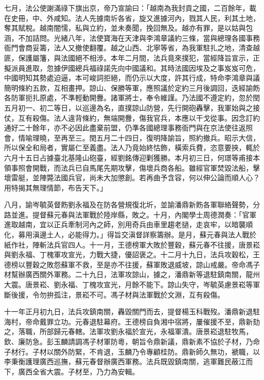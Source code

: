 \begin{pinyinscope}
七月，法公使謝滿祿下旗出京，帝乃宣諭曰：「越南為我封貢之國，二百餘年，載在史冊，中、外咸知。法人先據南圻各省，旋又進據河內，戮其人民，利其土地，奪其賦稅。越南闇懦，私與立約，並未奏聞，挽回無及。越亦有罪，是以姑與包涵，不加詰問。光緒八年，法使寶海在天津與李鴻章議約三條，當與總理各國事務衙門會商妥籌，法人又撤使翻覆。越之山西、北寧等省，為我軍駐扎之地，清查越匪，保護屬籓，與法國絕不相涉。本年二月間，法兵竟來撲犯，當經降旨宣示，正擬派員進取，忽據伊國總兵福祿諾先向中國議和。其時法國因埃及之事岌岌可危，中國明知其勢處迫逼，本可峻詞拒絕，而仍示以大度，許其行成，特命李鴻章與議簡明條約五款，互相畫押。諒山、保勝等軍，應照議於定約三月後調回，迭經諭飭各防軍扼扎原處，不準輕動開釁。諸軍將士，奉令維謹。乃法國不遵定約，忽於閏五月初一、初二等日，以巡邊為名，直撲諒山防營，先行開砲轟擊，我軍始與之接仗，互有殺傷。法人違背條約，無端開釁，傷我官兵，本應以干戈從事。因念訂約通好二十餘年，亦不必因此盡棄前盟，仍準各國總理事務衙門與在京法使往返照會，情喻理曉，至再至三。閏五月二十四日，復明降諭旨，照約撤兵。昭示大信，所以保全和局者，實屬仁至義盡。法人乃竟始終怙飾，橫索兵費，恣意要挾，輒於六月十五日占據臺北基隆山砲臺，經劉銘傳迎剿獲勝。本月初三日，何璟等甫接本領事照會開戰，而法兵已自馬尾先期攻擊，傷壞兵商各船。雖經官軍焚毀法船，擊壞雷艇，並陣斃法國兵官，尚未大加懲創。若再曲予含容，何以伸公論而順人心？用特揭其無理情節，布告天下。」

八月，諭岑毓英督飭劉永福及在防各營規復北圻，並諭潘鼎新飭各軍聯絡聲勢，分路並進。提督蘇元春與法軍戰於陸岸縣，敗之。十月，內閣學士周德潤奏：「官軍進取越南，宜以正兵牽制河內之師，別用奇兵由車里趨老撾，走哀牢，以暗襲順化，募用滇邊土人，必能得力。」得旨交滇督詳察籌辦。是月，蘇元春與法人戰於紙作社，陣斬法兵官四人。十一月，王德榜軍大敗於豐穀，蘇元春不往援，唐景崧與劉永福、丁槐軍攻宣光，力戰大捷，優詔褒之。十二月十九日，法兵攻穀松，王德榜以豐穀之敗怨蘇軍不救，至是亦不往援，蘇軍敗退威坡，諒山戒嚴。帝命馮子材幫辦廣西關外軍務。二十九日，法軍攻諒山，據之，潘鼎新等退駐鎮南關，龍州大震。唐景崧、劉永福、丁槐攻宣光，月餘不能下。諒山失守，岑毓英慮景崧等軍斷後援，令勿拚孤注，景崧不可。馮子材與法軍戰於文淵，互有殺傷。

十一年正月初九日，法兵攻鎮南關，轟毀關門而去，提督楊玉科戰歿。潘鼎新退駐海村，帝命戴罪立功。元春退駐幕府。王德榜自負湘中宿將，屢催援不至，鼎新劾之，落職，所部歸元春轄。法軍攻劉永福於宣光，永福軍潰。唐景崧退駐牧馬，欽、廉防急。彭玉麟請調馮子材軍防粵，朝旨令鼎新議，鼎新素不協於子材，乃命子材行。子材以關外防緊，不肯退，玉麟乃令專顧桂防。鼎新師久無功，褫職，以李秉衡護理廣西巡撫，蘇元春督辦廣西軍務。法兵既毀鎮南關，逃軍難民蔽江而下，廣西全省大震。子材至，乃力為安輯。


\end{pinyinscope}
